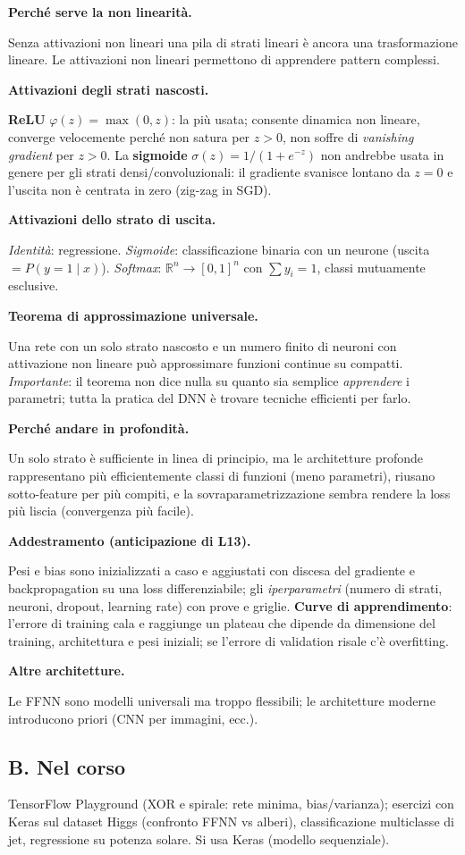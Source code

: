 \documentclass[11pt,a4paper]{article}
\newcommand{\dom}[1]{\par\smallskip\noindent\textbf{#1}\par\nopagebreak}
\begin{document}
\dom{Perch\'e serve la non linearit\`a.} Senza attivazioni non lineari una pila di strati lineari \`e ancora una trasformazione lineare. Le attivazioni non lineari permettono di apprendere pattern complessi.

\dom{Attivazioni degli strati nascosti.} \textbf{ReLU} $\varphi(z)=\max(0,z)$: la pi\`u usata; consente dinamica non lineare, converge velocemente perch\'e non satura per $z>0$, non soffre di \emph{vanishing gradient} per $z>0$. La \textbf{sigmoide} $\sigma(z)=1/(1+e^{-z})$ non andrebbe usata in genere per gli strati densi/convoluzionali: il gradiente svanisce lontano da $z=0$ e l'uscita non \`e centrata in zero (zig-zag in SGD).

\dom{Attivazioni dello strato di uscita.} \emph{Identit\`a}: regressione. \emph{Sigmoide}: classificazione binaria con un neurone (uscita $=P(y=1\mid x)$). \emph{Softmax}: $\mathbb R^n\to[0,1]^n$ con $\sum y_i=1$, classi mutuamente esclusive.

\dom{Teorema di approssimazione universale.} Una rete con un solo strato nascosto e un numero finito di neuroni con attivazione non lineare pu\`o approssimare funzioni continue su compatti. \emph{Importante}: il teorema non dice nulla su quanto sia semplice \emph{apprendere} i parametri; tutta la pratica del DNN \`e trovare tecniche efficienti per farlo.

\dom{Perch\'e andare in profondit\`a.} Un solo strato \`e sufficiente in linea di principio, ma le architetture profonde rappresentano pi\`u efficientemente classi di funzioni (meno parametri), riusano sotto-feature per pi\`u compiti, e la sovraparametrizzazione sembra rendere la loss pi\`u liscia (convergenza pi\`u facile).

\dom{Addestramento (anticipazione di L13).} Pesi e bias sono inizializzati a caso e aggiustati con discesa del gradiente e backpropagation su una loss differenziabile; gli \emph{iperparametri} (numero di strati, neuroni, dropout, learning rate) con prove e griglie. \textbf{Curve di apprendimento}: l'errore di training cala e raggiunge un plateau che dipende da dimensione del training, architettura e pesi iniziali; se l'errore di validation risale c'\`e overfitting.

\dom{Altre architetture.} Le FFNN sono modelli universali ma troppo flessibili; le architetture moderne introducono priori (CNN per immagini, ecc.).

\subsection*{B. Nel corso}
TensorFlow Playground (XOR e spirale: rete minima, bias/varianza); esercizi con Keras sul dataset Higgs (confronto FFNN vs alberi), classificazione multiclasse di jet, regressione su potenza solare. Si usa Keras (modello sequenziale).
\end{document}
